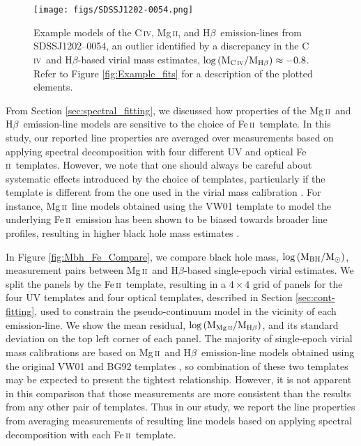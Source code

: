 \documentclass[fleqn,usenatbib]{mnras}
\newcommand{\mgii}{Mg\,\textsc{ii}}
\newcommand{\civ}{C\,\textsc{iv}}
\newcommand{\feii}{Fe\,\textsc{ii}}
\newcommand{\hbeta}{H\textsc{$\beta$}}
\begin{document}
\begin{figure*}
  \texttt{[image: figs/SDSSJ1202-0054.png]}
\caption{Example models of the \civ, \mgii, and \hbeta\ emission-lines from SDSSJ1202--0054, an outlier identified by a discrepancy in the \civ\ and \hbeta-based virial mass estimates, $\log\left(\rm{M_{\civ}}/\rm{M_{\hbeta}}\right) \approx -0.8$. Refer to Figure \ref{fig:Example_fits} for a description of the plotted elements.} \label{fig:Hbeta_outlier}
\end{figure*}

From Section \ref{sec:spectral_fitting}, we discussed how properties of the \mgii\ and \hbeta\ emission-line models are sensitive to the choice of \feii\ template. In this study, our reported line properties are averaged over measurements based on applying spectral decomposition with four different UV and optical \feii\ templates. However, we note that one should always be careful about systematic effects introduced by the choice of templates, particularly if the template is different from the one used in the virial mass calibration \citep[e.g.,][]{Woo_2018, Schindler_2020}. For instance, \mgii\ line models obtained using the VW01 template to model the underlying \feii\ emission has been shown to be biased towards broader line profiles, resulting in higher black hole mass estimates \citep[e.g.,][]{Schindler_2020}.

In Figure \ref{fig:Mbh_Fe_Compare}, we compare black hole mass, $\log{(\rm{M_{BH}}/\rm{M_\odot})}$, measurement pairs between \mgii\ and \hbeta-based single-epoch virial estimates. We split the panels by the \feii\ template, resulting in a $4\times4$ grid of panels for the four UV templates and four optical templates, described in Section \ref{sec:cont-fitting}, used to constrain the pseudo-continuum model in the vicinity of each emission-line. We show the mean residual, $\log\left(\rm{M_{\mgii}}/\rm{M_{\hbeta}}\right)$, and its standard deviation on the top left corner of each panel. The majority of single-epoch virial mass calibrations are based on \mgii\ and \hbeta\ emission-line models obtained using the original VW01 and BG92 templates \citep[e.g.,][]{Mclure_2004, Vestergaard_2006}, so combination of these two templates may be expected to present the tightest relationship. However, it is not apparent in this comparison that those measurements are more consistent than the results from any other pair of templates. Thus in our study, we report the line properties from averaging measurements of resulting line models based on applying spectral decomposition with each \feii\ template.
\end{document}
